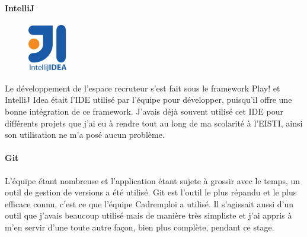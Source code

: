 \paragraph{IntelliJ}
\label{par:IntelliJ}
\begin{figure}
  \vspace{-2.5em}
  \begin{center}
    \includegraphics[width=0.15\textwidth]{Pictures/intellij_logo.png}
  \end{center}
\end{figure}
Le développement de l'espace recruteur s'est fait sous le framework Play! et IntelliJ Idea était l'IDE utilisé par l'équipe pour développer, puisqu'il offre une bonne intégration de ce framework.
J'avais déjà souvent utilisé cet IDE pour différents projets que j'ai eu à rendre tout au long de ma scolarité à l'EISTI, ainsi son utilisation ne m'a posé aucun problème.
\paragraph{Git}
\label{par:Git}
L'équipe étant nombreuse et l'application étant sujete à grossir avec le temps, un outil de gestion de versions a été utilisé.
Git est l'outil le plus répandu et le plus efficace connu, c'est ce que l'équipe Cadremploi a utilisé.
Il s'agissait aussi d'un outil que j'avais beaucoup utilisé mais de manière très simpliste et j'ai appris à m'en servir d'une toute autre façon, bien plus complète, pendant ce stage.
